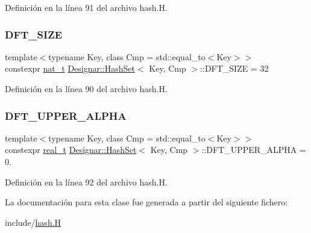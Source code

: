 Definición en la línea 91 del archivo hash.\+H.

\mbox{\label{class_designar_1_1_hash_set_a23c3da93ad9449838ab2c78526cd9dbd}} 
\subsubsection{\texorpdfstring{D\+F\+T\+\_\+\+S\+I\+ZE}{DFT\_SIZE}}
{\footnotesize\ttfamily template$<$typename Key, class Cmp = std\+::equal\+\_\+to$<$\+Key$>$$>$ \\
constexpr \hyperlink{namespace_designar_aa72662848b9f4815e7bf31a7cf3e33d1}{nat\+\_\+t} \hyperlink{class_designar_1_1_hash_set}{Designar\+::\+Hash\+Set}$<$ Key, Cmp $>$\+::D\+F\+T\+\_\+\+S\+I\+ZE = 32\hspace{0.3cm}{\ttfamily [static]}}



Definición en la línea 90 del archivo hash.\+H.

\mbox{\label{class_designar_1_1_hash_set_ab7e07181f29465aa1457e6abb9397be1}} 
\subsubsection{\texorpdfstring{D\+F\+T\+\_\+\+U\+P\+P\+E\+R\+\_\+\+A\+L\+P\+HA}{DFT\_UPPER\_ALPHA}}
{\footnotesize\ttfamily template$<$typename Key, class Cmp = std\+::equal\+\_\+to$<$\+Key$>$$>$ \\
constexpr \hyperlink{namespace_designar_aca2c32af26808dbec1f3a3071fad25ce}{real\+\_\+t} \hyperlink{class_designar_1_1_hash_set}{Designar\+::\+Hash\+Set}$<$ Key, Cmp $>$\+::D\+F\+T\+\_\+\+U\+P\+P\+E\+R\+\_\+\+A\+L\+P\+HA = 0.\hspace{0.3cm}{\ttfamily [static]}}



Definición en la línea 92 del archivo hash.\+H.



La documentación para esta clase fue generada a partir del siguiente fichero\+:\begin{DoxyCompactItemize}
\item 
include/\hyperlink{hash_8_h}{hash.\+H}\end{DoxyCompactItemize}
